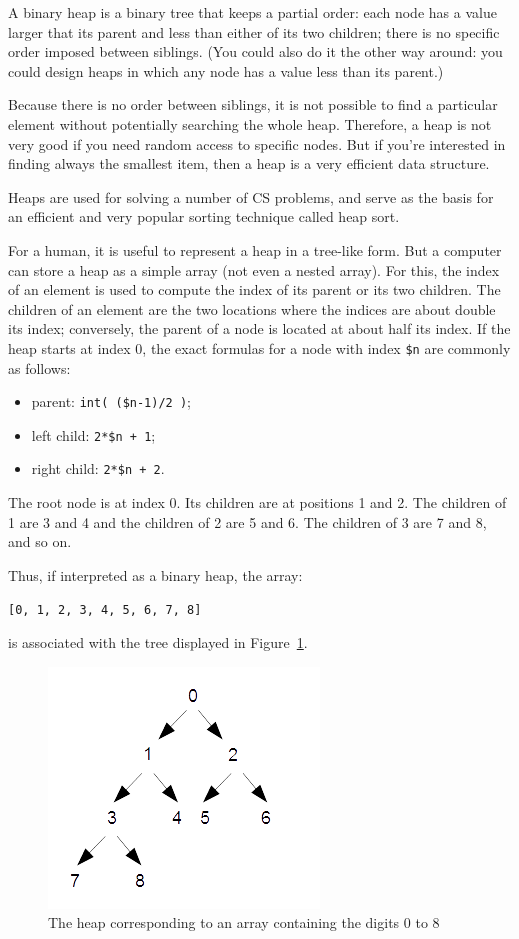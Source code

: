A binary heap is a binary tree that keeps a partial order: each 
node has a value larger that its parent and less than 
either of its two children; there is no specific order imposed 
between siblings. (You could also do it the other way 
around: you could design heaps in which any node has a value 
less than its parent.)

Because there is no order between siblings, it is not possible 
to find a particular element without potentially searching the 
whole heap. Therefore, a heap is not very good if you need 
random access to specific nodes. But if you're interested 
in finding always the smallest item, then a heap is a 
very efficient data structure.

Heaps are used for solving a number of CS problems, and serve 
as the basis for an efficient and very popular sorting technique 
called heap sort.

For a human, it is useful to represent a heap in a tree-like 
form. But a computer can store a heap as a simple array (not 
even a nested array). For this, the index of an element is 
used to compute the index of its parent or its two children.
The children of an element are the two locations where the 
indices are about double its index; conversely, the parent 
of a node is located at about half its index. If the heap 
starts at index 0, the exact formulas for a node with index 
\verb'$n' are commonly as follows:
\begin{itemize}
\item parent: \verb'int( ($n-1)/2 )';
\item left child: \verb'2*$n + 1';
\item right child: \verb'2*$n + 2'.
\end{itemize}
The root node is at index 0. Its children are at positions 
1 and 2. The children of 1 are 3 and 4 and the children of 
2 are 5 and 6. The children of 3 are 7 and 8, and so on.

Thus, if interpreted as a binary heap, the array:
\begin{verbatim}
[0, 1, 2, 3, 4, 5, 6, 7, 8]
\end{verbatim}

is associated with the tree displayed in Figure~\ref{fig.heap}.

\begin{figure}
\centerline
{\includegraphics[scale=1]{figs/figure_heap.png}}
\caption{The heap corresponding to an array containing the digits 0 to 8}
\label{fig.heap}
\end{figure}

